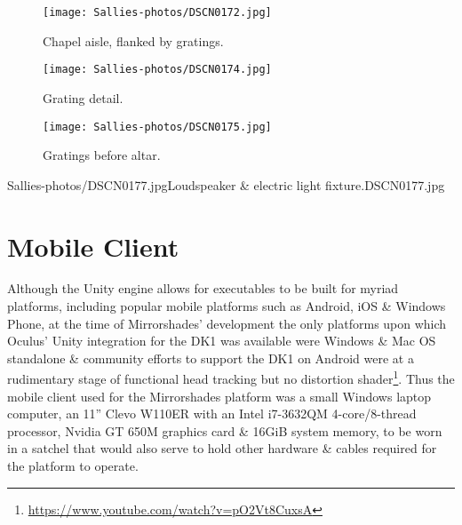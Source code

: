 \begin{figure}[h]
    \begin{center}
    \begin{minipage}{.32\textwidth}
        \begin{center}
        \texttt{[image: Sallies-photos/DSCN0172.jpg]}
        \caption{Chapel aisle, flanked by gratings.}
        \label{DSCN0172.jpg}
        \end{center}
    \end{minipage}%
    \hspace{.01\textwidth}
    \begin{minipage}{.32\textwidth}
		\begin{center}
        \texttt{[image: Sallies-photos/DSCN0174.jpg]}
        \caption{Grating detail.}
        \label{DSCN0174.jpg}
        \end{center}
    \end{minipage}%
    \hspace{.01\textwidth}
    \begin{minipage}{.32\textwidth}
        \begin{center}
        \texttt{[image: Sallies-photos/DSCN0175.jpg]}
        \caption{Gratings before altar.}
        \label{DSCN0175.jpg}
        \end{center}
    \end{minipage}
    \end{center}
\end{figure}

       {Sallies-photos/DSCN0177.jpg}{Loudspeaker \& electric light fixture.}{DSCN0177.jpg}
       

\section{Mobile Client}

Although the Unity engine allows for executables to be built for myriad platforms, including popular mobile platforms such as Android, iOS \& Windows Phone, at the time of Mirrorshades' development the only platforms upon which Oculus' Unity integration for the DK1 was available were Windows \& Mac OS standalone \& community efforts to support the DK1 on Android were at a rudimentary stage of functional head tracking but no distortion shader\footnote{\url{https://www.youtube.com/watch?v=pO2Vt8CuxsA}}. Thus the mobile client used for the Mirrorshades platform was a small Windows laptop computer, an 11'' Clevo W110ER with an Intel i7-3632QM 4-core/8-thread processor, Nvidia GT 650M graphics card \& 16GiB system memory, to be worn in a satchel that would also serve to hold other hardware \& cables required for the platform to operate.

